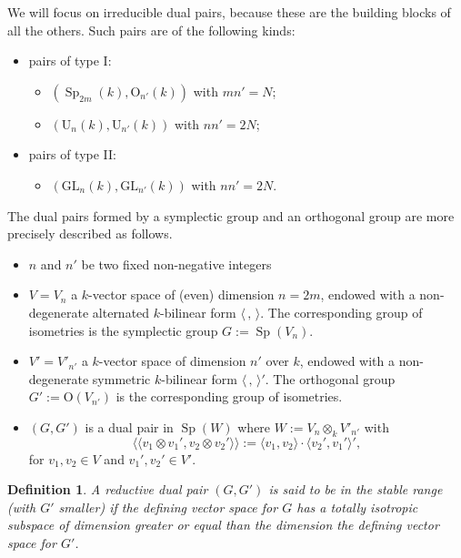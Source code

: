 \documentclass[12pt]{amsart}
\numberwithin{equation}{subsection}
\newtheorem{defn}[equation]{Definition}
\newcommand{\rU}{\mathrm{U}}
\newcommand{\GL}{\mathrm{GL}}
\newcommand{\Sp}{\operatorname{Sp}}
\def\rO{{\mathrm{O}}}
\begin{document}
We will focus on irreducible dual pairs, because these are the building blocks of all the others.  Such pairs are of the following kinds: 
\begin{itemize}
\item[$\bullet$] pairs of type I:
\begin{itemize}
\item[$\circ$] $(\Sp_{2m}(k),\rO_{n'}(k))$ with $mn'=N$;
\item[$\circ$] $(\rU_n(k),\rU_{n'}(k))$ with $nn'=2N$;
\end{itemize}
\item[$\bullet$]
pairs of type II: 
\begin{itemize}
\item[$\circ$] $(\GL_n(k),\GL_{n'}(k))$ with $nn'=2N$.
\end{itemize}
\end{itemize}

The dual pairs formed by a symplectic group and an orthogonal group are more precisely described as follows.
\begin{itemize}
\item  $n$ and $n'$ be two fixed non-negative integers
\item $V=V_n$ a $k$-vector space of (even) dimension $n=2m$, endowed with a non-degenerate alternated
$k$-bilinear form $\langle \,,\,\rangle$.
The corresponding group of isometries  is the symplectic group \textit{$G:=\Sp(V_n)$}.
\item $V'=V'_{n'}$  a  $k$-vector space of dimension $n'$ over $k$, endowed with a non-degenerate symmetric
$k$-bilinear form $\langle \,,\,\rangle'$.
The orthogonal group \textit{$G':=\rO(V_{n'})$} is the corresponding group of
isometries.
\item  $(G,G')$ is a dual pair in $\Sp(W)$ where $W:=V_n\otimes_k V'_{n'}$ with
\[\langle\langle v_1\otimes v_1',v_2\otimes v_2'\rangle\rangle:=\langle v_1,v_2\rangle\cdot  \langle v_2',v_1'\rangle',\]
for $v_1,v_2\in V$ and $v_1',v_2'\in V'$.
\end{itemize}

\begin{defn} \label{defn:stable-range} {\rm
A reductive dual pair $(G,G')$ is said to be in the \textit{stable range} (with $G'$ smaller) if the defining vector space for $G$ has a totally isotropic subspace of dimension 
greater or equal than the dimension the defining vector space for $G'$.
}
\end{defn}
\end{document}
